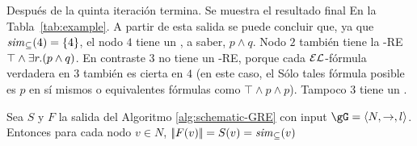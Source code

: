 \begin{ex}
Despu\'es de la quinta iteraci\'on termina. Se muestra el resultado final
En la Tabla~\ref{tab:example}. A partir de esta salida se puede concluir que,
ya que${\it sim}_\subseteq(4)=\{4\}$, el nodo $4$ tiene un \posre, a saber,
$p\wedge q$. Nodo $2$ tambi\'en tiene la \EL-RE $\top\wedge\exists r.(p\wedge
q)$. En contraste $3$ no tiene un \EL-RE, porque cada
$\mathcal{EL}$-f\'ormula verdadera en $3$ tambi\'en es cierta en $4$ (en este caso, el
S\'olo tales f\'ormula posible es $p$ en s\'i mismos o equivalentes
f\'ormulas como $\top\wedge p\wedge p$). Tampoco $3$ tiene un \posre.

\end{ex}
\fi

\iffullversion
\newtheorem{teorema}{Teorema}
\begin{theorem}\label{thm:correctness-schematic-GRE}
Sea $S$ y $F$ la salida del Algoritmo
\ref{alg:schematic-GRE} con input $\gG=\tup{N,\to,l}$. Entonces para cada
nodo $v\in N$, $|\!|F(v)|\!| = S(v) = {\it sim}_\subseteq(v)$
\end{theorem}
\fi

